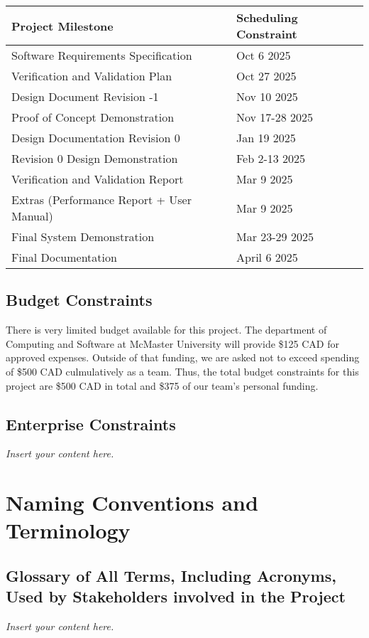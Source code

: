 \documentclass[12pt]{article}
\newcommand{\lips}{\textit{Insert your content here.}}
\begin{document}
\begin{tabular}{|m{5cm}|m{10cm}|}
    \hline
    Project Milestone & Scheduling Constraint\\
    \hline
    Software Requirements Specification & Oct 6 2025\\
    \hline
    Verification and Validation Plan & Oct 27 2025\\
    \hline
    Design Document Revision -1 & Nov 10 2025\\
    \hline
    Proof of Concept Demonstration & Nov 17-28 2025\\
    \hline
    Design Documentation Revision 0 & Jan 19 2025\\
    \hline
    Revision 0 Design Demonstration & Feb 2-13 2025\\
    \hline
    Verification and Validation Report & Mar 9 2025\\
    \hline
    Extras (Performance Report + User Manual) & Mar 9 2025\\
    \hline
    Final System Demonstration & Mar 23-29 2025\\
    \hline
    Final Documentation & April 6 2025\\
    \hline
\end{tabular}




\subsection{Budget Constraints}

\par{There is very limited budget available for this project. The department of Computing and Software at McMaster University 
will provide \$125 CAD for approved expenses. Outside of that funding, we are asked not to exceed spending of \$500 CAD
culmulatively as a team. Thus, the total budget constraints for this project are \$500 CAD in total and \$375 of our team's personal funding.}

\subsection{Enterprise Constraints}
\lips

\section{Naming Conventions and Terminology}
\subsection{Glossary of All Terms, Including Acronyms, Used by Stakeholders
involved in the Project}
\lips
\end{document}
